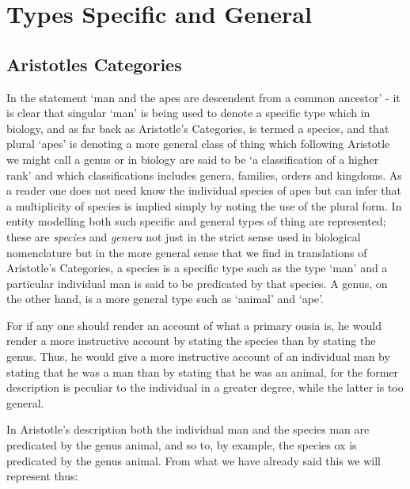 \section{Types Specific and General}
\subsection{Aristotles Categories}
\noindent In the statement `man and the apes are descendent from a common ancestor' - it is clear that singular `man' is being used to denote a specific type which in biology, and as far back as Aristotle's Categories, is termed a species, and that plural `apes' is denoting a more general class of thing which following Aristotle we might call a genus or in biology are said to be `a classification of a higher rank' and which classifications includes genera, families, orders and kingdoms. As a reader one does not need know the individual species of apes but can infer that a multiplicity of species is implied simply by noting the use of the plural form. In entity modelling both such specific and general types of thing are represented; these are \textit{species} and \textit{genera} not just in the strict sense used in biological nomenclature but in the more general sense that we find in translations of Aristotle's Categories, a species is a specific type such as the type `man' and a particular individual man is said to be predicated by that species. A genus, on the other hand, is a more general type 
such as `animal' and `ape'.\\

\begin{erquote}
For if any one should render an account of what a primary ousia is, he would render a more instructive account by stating the species than by stating the genus. Thus, he would give a more instructive account of an individual man by stating that he was a man than by stating that he was an animal, for the former description is peculiar to the individual in a greater degree, while the latter is too general.\\
\end{erquote}

\noindent In Aristotle's description both the individual man and the species man are predicated by the genus animal, and so to, by example, the species ox is predicated by the genus animal. From what we have already said this we will represent thus:\\
\begin{center}

\end{center}

